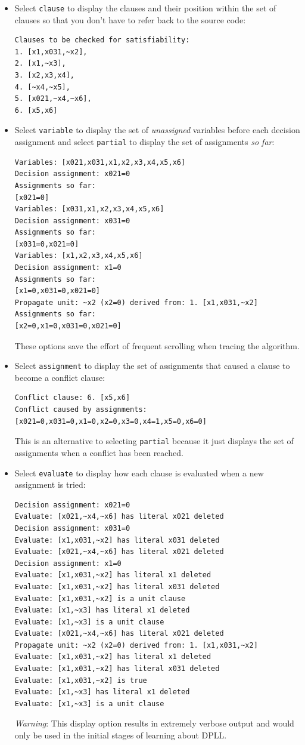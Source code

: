 \documentclass[11pt]{article}
\newcommand*{\p}[1]{\textup{\texttt{#1}}}
\begin{document}
\begin{itemize}

\item Select \p{clause} to display the clauses and their position within
the set of clauses so that you don't have to refer back to the source
code:

\begin{verbatim}
Clauses to be checked for satisfiability:
1. [x1,x031,~x2],
2. [x1,~x3],
3. [x2,x3,x4],
4. [~x4,~x5],
5. [x021,~x4,~x6],
6. [x5,x6]
\end{verbatim}

\item Select \p{variable} to display the set of \emph{unassigned}
variables before each decision assignment and select \p{partial} to
display the set of assignments \emph{so far}:

\begin{verbatim}
Variables: [x021,x031,x1,x2,x3,x4,x5,x6]
Decision assignment: x021=0
Assignments so far:
[x021=0]
Variables: [x031,x1,x2,x3,x4,x5,x6]
Decision assignment: x031=0
Assignments so far:
[x031=0,x021=0]
Variables: [x1,x2,x3,x4,x5,x6]
Decision assignment: x1=0
Assignments so far:
[x1=0,x031=0,x021=0]
Propagate unit: ~x2 (x2=0) derived from: 1. [x1,x031,~x2]
Assignments so far:
[x2=0,x1=0,x031=0,x021=0]
\end{verbatim}

These options save the effort of frequent scrolling when tracing the
algorithm.

\item Select \p{assignment} to display the set of assignments that caused a
clause to become a conflict clause:
\begin{verbatim}
Conflict clause: 6. [x5,x6]
Conflict caused by assignments:
[x021=0,x031=0,x1=0,x2=0,x3=0,x4=1,x5=0,x6=0]
\end{verbatim}
This is an alternative to selecting \p{partial} because it just displays
the set of assignments when a conflict has been reached.

\item Select \p{evaluate} to display how each clause is evaluated when a
new assignment is tried:

\begin{verbatim}
Decision assignment: x021=0
Evaluate: [x021,~x4,~x6] has literal x021 deleted
Decision assignment: x031=0
Evaluate: [x1,x031,~x2] has literal x031 deleted
Evaluate: [x021,~x4,~x6] has literal x021 deleted
Decision assignment: x1=0
Evaluate: [x1,x031,~x2] has literal x1 deleted
Evaluate: [x1,x031,~x2] has literal x031 deleted
Evaluate: [x1,x031,~x2] is a unit clause
Evaluate: [x1,~x3] has literal x1 deleted
Evaluate: [x1,~x3] is a unit clause
Evaluate: [x021,~x4,~x6] has literal x021 deleted
Propagate unit: ~x2 (x2=0) derived from: 1. [x1,x031,~x2]
Evaluate: [x1,x031,~x2] has literal x1 deleted
Evaluate: [x1,x031,~x2] has literal x031 deleted
Evaluate: [x1,x031,~x2] is true
Evaluate: [x1,~x3] has literal x1 deleted
Evaluate: [x1,~x3] is a unit clause
\end{verbatim}
\emph{Warning}: This display option results in extremely verbose output
and would only be used in the initial stages of learning about DPLL.


\end{itemize}
\end{document}

